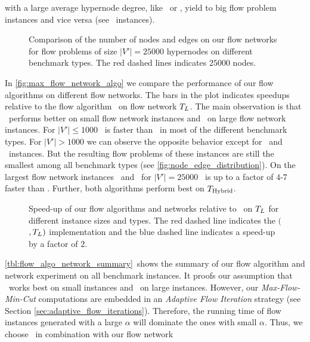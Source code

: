 with a large average  hypernode degree, like \Primal~or \Literal, yield to big flow problem 
instances and vice versa (see \Dual~instances).\\
\begin{figure}[ht!]
\centering
\caption{Comparison of the number of nodes and edges on our flow networks for 
         flow problems of size $|V'| = 25000$ hypernodes on different benchmark types.
         The red dashed lines indicates $25000$ nodes.}
\label{fig:node_edge_distribution}
\end{figure} 
In \autoref{fig:max_flow_network_algo} we compare the performance of our flow algorithms on
different flow networks. The bars in the plot indicates speedups relative to the flow algorithm
\EdmondKarp~on flow network $T_L$. The main observation is that \EdmondKarp~performs
better on small flow network instances and \GoldbergTarjan~on large flow network instances. For $|V'| \le 1000$
\EdmondKarp~is faster than \GoldbergTarjan~in most of the different benchmark types. For
$|V'| > 1000$ we can observe the opposite behavior except for \DAC~and \Dual~instances. But the
resulting flow problems of these instances are still the smallest among all benchmark types
(see \autoref{fig:node_edge_distribution}). On the largest flow network instances \Primal~and
\Literal~for $|V'| = 25000$ \GoldbergTarjan~is up to a factor of $4$-$7$ faster than \EdmondKarp.
Further, both algorithms perform best on $T_{\text{Hybrid}}$.
\begin{figure}
\centering
\caption{Speed-up of our flow algorithms and networks relative to \EdmondKarp~on
         $T_L$ for different instance sizes and types. The red dashed line indicates the
         $($\EdmondKarp$,T_L)$ implementation and the blue dashed line
         indicates a speed-up by a factor of $2$.}
\label{fig:max_flow_network_algo}
\end{figure} 
\autoref{tbl:flow_algo_network_summary}~shows the summary of our flow algorithm and network experiment
on all benchmark instances. It proofs our assumption that \EdmondKarp~works best on small instances
and \GoldbergTarjan~on large instances. However, our \emph{Max-Flow-Min-Cut} computations
are embedded in an \emph{Adaptive Flow Iteration} strategy (see Section \ref{sec:adaptive_flow_iterations}).
Therefore, the running time of flow instances generated with a large $\alpha$ will dominate the
ones with small $\alpha$. Thus, we choose \GoldbergTarjan~in combination with our flow network
